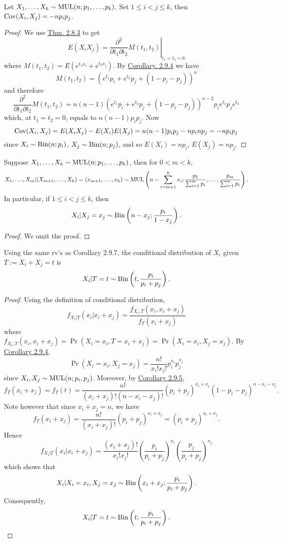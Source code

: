 \documentclass[11pt,fleqn]{book} %
\begin{document}
\begin{corollary} Let \(X_1, \ldots, X_k \sim \operatorname{MUL}(n; p_1, \ldots, p_k)\). Set \(1 \leq i < j \leq k\), then \(\operatorname{Cov}(X_i, X_j) = -np_ip_j\).
\end{corollary}
\begin{proof} We use \hyperref[thm:283]{Thm. 2.8.3} to get 
\[
E(X_iX_j) = \left.\frac{\partial^2}{\partial t_1 \partial t_2}M(t_1, t_2)\right|_{t_1 = t_2 = 0}
\]
where \(M(t_1, t_2) = E(e^{t_1x_i} + e^{t_2x_j})\). By \hyperref[cor:294]{Corollary. 2.9.4} we have
\[
M(t_1, t_2) = (e^{t_1}p_i + e^{t_2}p_j + (1 - p_i - p_j))^n
\]
and therefore
\[
\frac{\partial^2}{\partial t_1 \partial t_2}M(t_1, t_2) = n(n-1)(e^{t_1}p_i + e^{t_2}p_j + (1 - p_i - p_j))^{n-2}p_ie^{t_1}p_je^{t_2}
\]
which, at \(t_1 = t_2 = 0\), equals to \(n(n-1)p_ip_j\). Now
\[
\operatorname{Cov}(X_i, X_j) = E(X_iX_j) - E(X_i)E(X_j) = n(n-1)p_ip_j - np_inp_j = -np_ip_j
\]
since \(X_i \sim \operatorname{Bin}(n; p_i)\), \(X_j \sim \operatorname{Bin}(n; p_j)\), and so \(E(X_i) = np_i\), \(E(X_j) = np_j\).
\end{proof}

\begin{corollary} Suppose \(X_1, \ldots, X_k \sim \operatorname{MUL}(n; p_1, \ldots, p_k)\), then for \(0 < m < k\),
\[
X_1, \ldots, X_m|(X_{m+1}, \ldots, X_k) = (x_{m+1}, \ldots, x_k) \sim \operatorname{MUL}\left(n - \sum_{i=m+1}^k x_i; \frac{p_1}{\sum_{i=1}^mp_i}, \ldots, \frac{p_m}{\sum_{i=1}^m p_i}\right).
\]
\indent In particular, if \(1 \leq i < j \leq k\), then
\[
X_i | X_j = x_j \sim \operatorname{Bin}\left(n - x_j; \frac{p_i}{1 - x_j}\right).
\]
\end{corollary}
\begin{proof}
We omit the proof.
\end{proof}

\begin{corollary} Using the same rv's as Corollary 2.9.7, the conditional distribution of \(X_i\) given \(T := X_i + X_j = t\) is
\[
X_i|T = t \sim \operatorname{Bin}\left(t, \frac{p_i}{p_i + p_j}\right).
\]
\end{corollary}
\begin{proof} Using the definition of conditional distribution, 
\[
f_{X_i|T}(x_i|x_i + x_j) = \frac{f_{X_i, T}(x_i, x_i + x_j)}{f_T(x_i + x_j)}
\]
where \(f_{X_i, T}(x_i, x_i + x_j) = \Pr(X_i = x_i, T = x_i + x_j) = \Pr(X_i = x_i, X_j = x_j)\). By \hyperref[cor:294]{Corollary 2.9.4}, 
\[
\Pr(X_i = x_i, X_j = x_j) = \frac{n!}{x_i!x_j!}p_i^{x_i}p_j^{x_j}
\]
since \(X_i, X_j \sim \operatorname{MUL}(n; p_i, p_j)\). Moreover, by \hyperref[cor:295]{Corollary 2.9.5}, 
\[
f_T(x_i + x_j) = f_T(t) = \frac{n!}{(x_i + x_j)!(n - x_i - x_j)!}(p_i + p_j)^{x_i + x_j}(1 - p_i - p_j)^{n - x_i - x_j}.
\]
\indent Note however that since \(x_i + x_j = n\), we have
\[
f_T(x_i + x_j) = \frac{n!}{(x_i + x_j)!}(p_i + p_j)^{x_i + x_j} = (p_i + p_j)^{x_i + x_j}.
\]
\indent Hence
\[
f_{X_i|T}(x_i|x_i + x_j) = \frac{(x_i + x_j)!}{x_i!x_j!}\left(\frac{p_i}{p_i + p_j}\right)^{x_i}\left(\frac{p_j}{p_i + p_j}\right)^{x_j}
\]
which shows that
\[
X_i|X_i = x_i, X_j = x_j \sim \operatorname{Bin}\left(x_i + x_j; \frac{p_i}{p_i+p_j}\right).
\]
\indent Consequently,
\[
X_i|T = t \sim \operatorname{Bin}\left(t; \frac{p_i}{p_i+p_j}\right).
\]
\end{proof}
\end{document}
